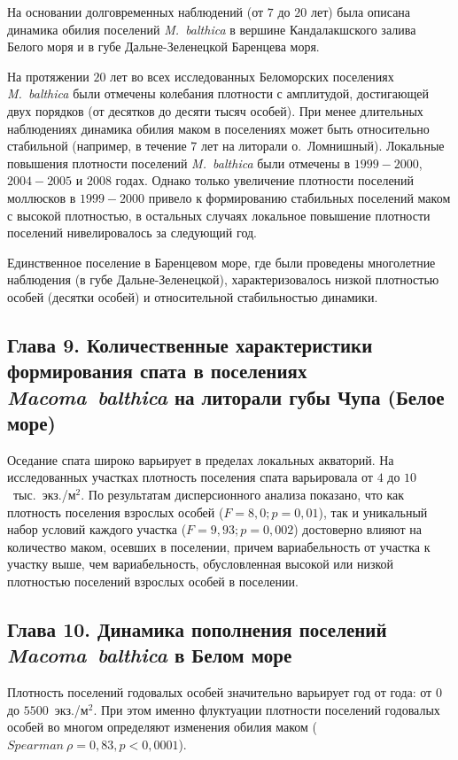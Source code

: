 {На основании долговременных наблюдений (от $7$ до $20$ лет) была описана динамика обилия поселений \textit{M.~balthica} в вершине Кандалакшского залива Белого моря и в губе Дальне-Зеленецкой Баренцева моря.

На протяжении $20$ лет во всех исследованных Беломорских поселениях \textit{M.~balthica} были отмечены колебания плотности с амплитудой, достигающей двух порядков (от десятков до десяти тысяч особей).
При менее длительных наблюдениях динамика обилия маком в поселениях может быть относительно стабильной (например, в течение $7$ лет на литорали о.~Ломнишный).
Локальные повышения плотности поселений \textit{M.~balthica} были отмечены в $1999-2000$, $2004-2005$ и $2008$ годах.
Однако только увеличение плотности поселений моллюсков в $1999-2000$ привело к формированию стабильных поселений маком с высокой плотностью, в остальных случаях локальное повышение плотности поселений нивелировалось за следующий год.

Единственное поселение в Баренцевом море, где были проведены многолетние наблюдения (в губе Дальне-Зеленецкой), характеризовалось низкой плотностью особей (десятки особей) и относительной стабильностью динамики. 

\subsection*{Глава 9. Количественные характеристики формирования спата в поселениях \textit{Macoma~balthica} на литорали губы Чупа (Белое море)} 

Оседание спата широко варьирует в пределах локальных акваторий.
На исследованных участках плотность поселения спата варьировала от $4$ до $10$~тыс.~экз./м$^2$.
По результатам дисперсионного анализа показано, что как плотность поселения взрослых особей ($F = 8,0; p = 0,01$), так и уникальный набор условий каждого участка ($F = 9,93; p = 0,002$) достоверно влияют на количество маком, осевших в поселении, причем вариабельность от участка к участку выше, чем вариабельность, обусловленная высокой или низкой плотностью поселений взрослых особей в поселении. 

\subsection*{Глава 10. Динамика пополнения поселений \textit{Macoma~balthica} в Белом море}

Плотность поселений годовалых особей значительно варьирует год от года: от $0$ до $5500$~экз./м$^2$.
При этом именно флуктуации плотности поселений годовалых особей во многом определяют изменения обилия маком ($Spearman\ \rho = 0,83, p < 0,0001$).

}
